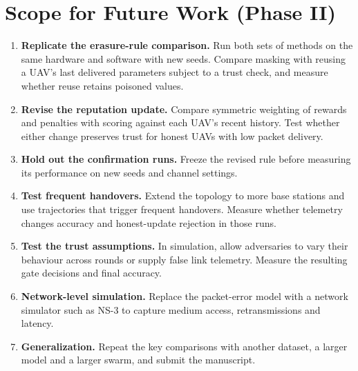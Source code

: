 \section{Scope for Future Work (Phase II)}
\begin{enumerate}
\item \textbf{Replicate the erasure-rule comparison.} Run both sets of methods
  on the same hardware and software with new seeds. Compare masking with reusing
  a UAV's last delivered parameters subject to a trust check, and measure whether
  reuse retains poisoned values.
\item \textbf{Revise the reputation update.} Compare symmetric weighting of
  rewards and penalties with scoring against each UAV's recent history. Test
  whether either change preserves trust for honest UAVs with low packet delivery.
\item \textbf{Hold out the confirmation runs.} Freeze the revised rule before
  measuring its performance on new seeds and channel settings.
\item \textbf{Test frequent handovers.} Extend the topology to more base stations
  and use trajectories that trigger frequent handovers. Measure whether telemetry
  changes accuracy and honest-update rejection in those runs.
\item \textbf{Test the trust assumptions.} In simulation, allow adversaries to
  vary their behaviour across rounds or supply false link telemetry. Measure the
  resulting gate decisions and final accuracy.
\item \textbf{Network-level simulation.} Replace the packet-error model with a
  network simulator such as NS-3 to capture medium access, retransmissions and
  latency.
\item \textbf{Generalization.} Repeat the key comparisons with another dataset, a
  larger model and a larger swarm, and submit the manuscript.
\end{enumerate}
